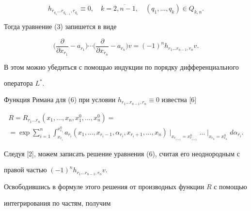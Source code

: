 \begin{equation}


h_{r_{q_{1}}\dotsc r_{q_{k-1}},r_{q_{k}}}\equiv 0,\quad k=\overline{2,n-1},


\quad (q_{1},\dotsc ,q_{k})\in Q_{k,n}.


\end{equation}


Тогда уравнение (3) запишется в виде


\begin{equation}


\bigg( \frac{\partial}{\partial x_{r_{1}}}-a_{r_{1}}\bigg)


\dotsb \bigg( \frac{\partial}{\partial x_{r_{n}}}-a_{r_{n}}\bigg) v=


(-1)^{n} h_{r_{1}\dotsc r_{n-1},r_{n}}v.


\end{equation}


В этом можно убедиться с помощью индукции по порядку дифференциального


оператора $L^{*}.$


Функция Римана для (6) при условии \mbox{$h_{r_{1}\dotsc r_{n-1},r_{n}}


\equiv 0$} известна [6]


\begin{multline*}


R=R_{r_{1}\dotsc r_{n}}(x_{1},\dotsc ,x_{n},x_{1}^{0},\dotsc


,x_{n}^{0})= \\


=\exp \sum_{i=1}^{n} \int_{x_{r_{i}}}^{x_{r_{i}}^{0}} a_{r_{i}}


(x_{1},\dotsc ,


x_{r_{i}-1},


\alpha_{r_{i}},x_{r_{i}+1},\dotsc ,x_{n}) \mid_{x_{r_{i+1}}=x_{r_{i+1}}^{0}}


\dotsc\mid_{x_{r_{n}}=x_{r_{n}}^{0}} d\alpha_{r_{i}}.


\end{multline*}


Следуя [2], можем записать решение уравнения (6), считая его неоднородным с


правой частью $(-1)^{n}h_{r_{1}\dotsc r_{n-1},r_{n}}v$.


Освободившись в формуле этого решения от производных функции $R$ с помощью


интегрирования по частям, получим



